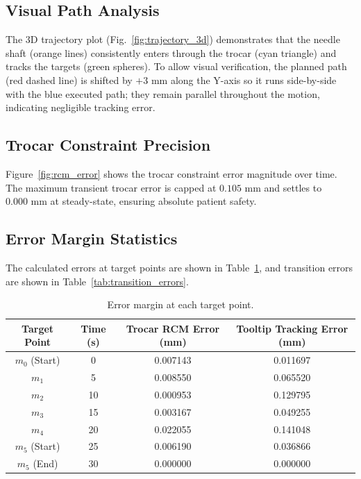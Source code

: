 \documentclass[11pt,a4paper]{article}
\begin{document}
\subsection{Visual Path Analysis}
The 3D trajectory plot (Fig.~\ref{fig:trajectory_3d}) demonstrates that the needle shaft (orange lines) consistently enters through the trocar (cyan triangle) and tracks the targets (green spheres). To allow visual verification, the planned path (red dashed line) is shifted by $+3\text{ mm}$ along the Y-axis so it runs side-by-side with the blue executed path; they remain parallel throughout the motion, indicating negligible tracking error.

\subsection{Trocar Constraint Precision}
Figure~\ref{fig:rcm_error} shows the trocar constraint error magnitude over time. The maximum transient trocar error is capped at $0.105\text{ mm}$ and settles to $0.000\text{ mm}$ at steady-state, ensuring absolute patient safety.

\subsection{Error Margin Statistics}
The calculated errors at target points are shown in Table~\ref{tab:target_errors}, and transition errors are shown in Table~\ref{tab:transition_errors}. 

\begin{table}[H]
\centering
\caption{Error margin at each target point.}
\label{tab:target_errors}
\begin{tabular}{@{}cccc@{}}
\toprule
Target Point & Time (s) & Trocar RCM Error (mm) & Tooltip Tracking Error (mm) \\ \midrule
$m_0$ (Start) & 0  & 0.007143 & 0.011697 \\
$m_1$         & 5  & 0.008550 & 0.065520 \\
$m_2$         & 10 & 0.000953 & 0.129795 \\
$m_3$         & 15 & 0.003167 & 0.049255 \\
$m_4$         & 20 & 0.022055 & 0.141048 \\
$m_5$ (Start) & 25 & 0.006190 & 0.036866 \\
$m_5$ (End)   & 30 & 0.000000 & 0.000000 \\ \bottomrule
\end{tabular}
\end{table}
\end{document}
